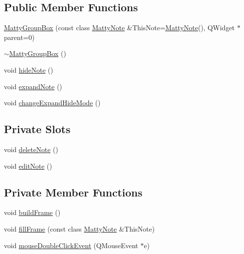 \subsection*{Public Member Functions}
\begin{DoxyCompactItemize}
\item 
\hyperlink{class_matty_group_box_a3445932bd0e2d39d640cc9457580c39e}{Matty\+Group\+Box} (const class \hyperlink{class_matty_note}{Matty\+Note} \&This\+Note=\hyperlink{class_matty_note}{Matty\+Note}(), Q\+Widget $\ast$parent=0)
\item 
\hyperlink{class_matty_group_box_acf5f5023cf210a83e9846a35b149dd70}{$\sim$\+Matty\+Group\+Box} ()
\item 
void \hyperlink{class_matty_group_box_ad96bd7663326b7b3e15c67455ccea32a}{hide\+Note} ()
\item 
void \hyperlink{class_matty_group_box_a9797e81eba743d81cf8f45758921d8e7}{expand\+Note} ()
\item 
void \hyperlink{class_matty_group_box_acb2b6f0d418195c1a9838f4c3565378f}{change\+Expand\+Hide\+Mode} ()
\end{DoxyCompactItemize}
\subsection*{Private Slots}
\begin{DoxyCompactItemize}
\item 
void \hyperlink{class_matty_group_box_ac7b7f1db6ea96e4c4b0f58fb87f86900}{delete\+Note} ()
\item 
void \hyperlink{class_matty_group_box_a446df41d130f1d6a411f35d80d62b055}{edit\+Note} ()
\end{DoxyCompactItemize}
\subsection*{Private Member Functions}
\begin{DoxyCompactItemize}
\item 
void \hyperlink{class_matty_group_box_ae9862aae672bd2cf4a99da541beef696}{build\+Frame} ()
\item 
void \hyperlink{class_matty_group_box_a982e84ed3ae5f61b542269e9b5e8ebba}{fill\+Frame} (const class \hyperlink{class_matty_note}{Matty\+Note} \&This\+Note)
\item 
void \hyperlink{class_matty_group_box_af5eee7ea107159615e3d23dd43cc9ff4}{mouse\+Double\+Click\+Event} (Q\+Mouse\+Event $\ast$e)
\end{DoxyCompactItemize}
